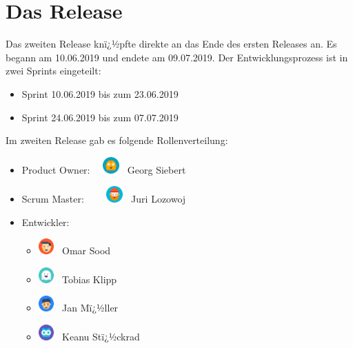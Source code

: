 \documentclass[12pt, titlepage]{scrartcl}
\newcommand{\RN}[1]{%
	\textup{\uppercase\expandafter{\romannumeral#1}}%
}
\begin{document}
	\section{Das Release \RN{2}}
		Das zweiten Release knï¿½pfte direkte an das Ende des ersten Releases an. Es begann am  10.06.2019 und endete am 09.07.2019. Der Entwicklungsprozess ist in zwei Sprints eingeteilt:
		\begin{itemize}
			\item Sprint \RN{3} 10.06.2019 bis zum 23.06.2019
			\item Sprint \RN{4} 24.06.2019 bis zum 07.07.2019
		\end{itemize}
		Im zweiten Release gab es folgende Rollenverteilung:
		\begin{itemize}
			\item Product Owner:  \ \ \includegraphics[width=0.05\textwidth]{georg_avatar.png} \ Georg Siebert
			\item Scrum Master:  \ \ \ \ \includegraphics[width=0.05\textwidth]{juri_avatar.png} \ Juri Lozowoj
			\item Entwickler:
			\begin{itemize}
				\item \includegraphics[width=0.05\textwidth]{omar_avatar.png} \ Omar Sood 
				\item \includegraphics[width=0.05\textwidth]{tobias_avatar.png} \ Tobias Klipp
				\item \includegraphics[width=0.05\textwidth]{jan_avatar.png} \ Jan Mï¿½ller
				\item \includegraphics[width=0.05\textwidth]{keanu_avatar.png} \ Keanu Stï¿½ckrad
			\end{itemize}
		\end{itemize}
	
\end{document}
